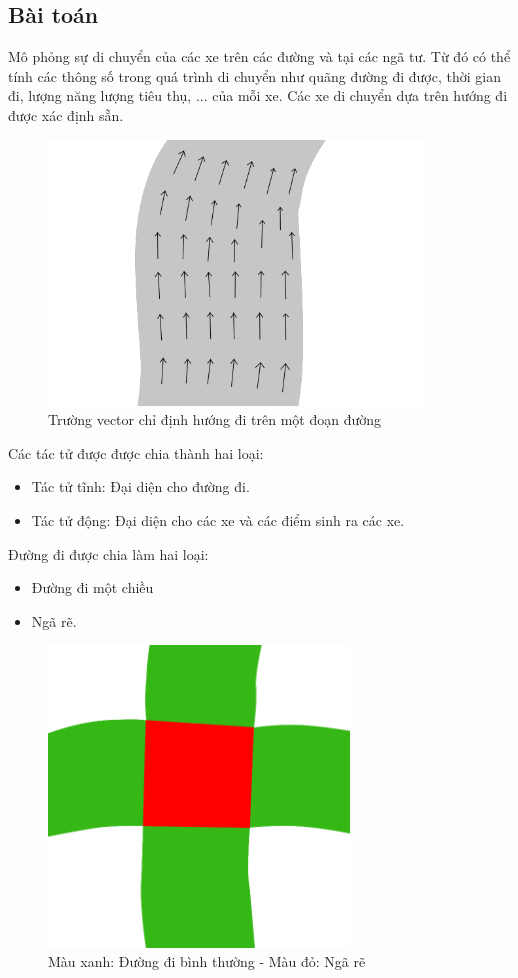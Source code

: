 \documentclass[../report.tex]{subfiles}
\begin{document}
\subsection{Bài toán} 
Mô phỏng sự di chuyển của các xe trên các đường và tại các ngã tư. 
Từ đó có thể tính các thông số trong quá trình di chuyển như quãng đường đi được, 
thời gian đi, lượng năng lượng tiêu thụ, ... của mỗi xe. 
Các xe di chuyển dựa trên hướng đi được xác định sẵn. 
\begin{figure}[H]
\centering
\includegraphics[width=10cm]{figures/normal-road.png}
\caption{Trường vector chỉ định hướng đi trên một đoạn đường}
\end{figure}

Các tác tử được được chia thành hai loại: 
\begin{itemize}
\item Tác tử tĩnh: Đại diện cho đường đi. 
\item Tác tử động: Đại diện cho các xe và các điểm sinh ra các xe. 
\end{itemize}

Đường đi được chia làm hai loại: 
\begin{itemize}
\item Đường đi một chiều
\item Ngã rẽ. 
\end{itemize}

\begin{figure}[H]
\centering
\includegraphics[width=8cm]{figures/cross-road.png}
\caption{Màu xanh: Đường đi bình thường - Màu đỏ: Ngã rẽ}
\end{figure}
\end{document}

